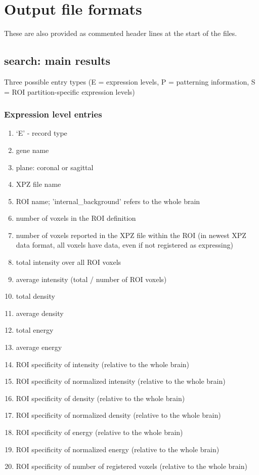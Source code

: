 \documentclass[10pt]{article}
\begin{document}
\section{Output file formats}
These are also provided as commented header lines at the start of the files.

\subsection{search: main results}

Three possible entry types (E = expression levels, P = patterning information, S = ROI partition-specific expression levels)

\subsubsection{Expression level entries}

\begin{enumerate}
\item `E' - record type
\item gene name
\item plane: coronal or sagittal
\item XPZ file name
\item ROI name; 'internal\_background' refers to the whole brain
\item number of voxels in the ROI definition
\item number of voxels reported in the XPZ file within the ROI (in newest XPZ data format, all voxels have data, even if not registered as expressing)
\item total intensity over all ROI voxels
\item average intensity (total / number of ROI voxels)
\item total density
\item average density
\item total energy
\item average energy
\item ROI specificity of intensity (relative to the whole brain)
\item ROI specificity of normalized intensity (relative to the whole brain)
\item ROI specificity of density (relative to the whole brain)
\item ROI specificity of normalized density (relative to the whole brain)
\item ROI specificity of energy (relative to the whole brain)
\item ROI specificity of normalized energy (relative to the whole brain)
\item ROI specificity of number of registered voxels (relative to the whole brain)
\end{enumerate}
\end{document}
